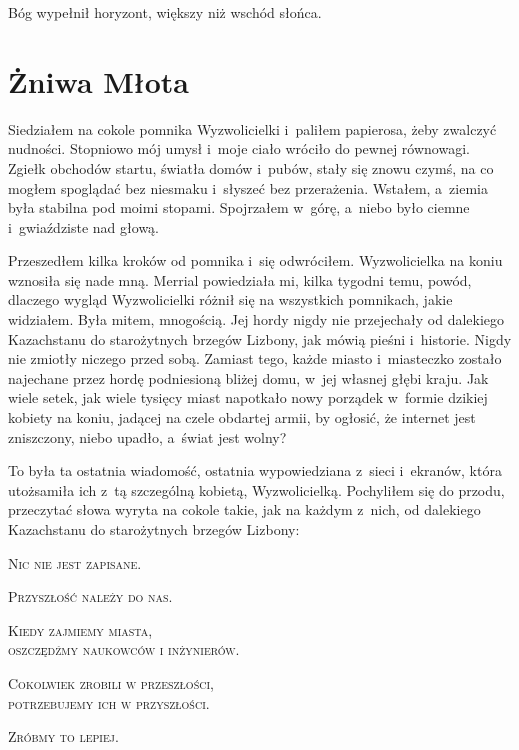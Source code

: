 \documentclass[oneside,polish,11pt,sfheadings]{mwbk}
\begin{document}
Bóg wypełnił horyzont, większy niż wschód słońca.


\chapter{Żniwa Młota}

Siedziałem na cokole pomnika Wyzwolicielki i~paliłem papierosa, żeby
zwalczyć nudności. Stopniowo mój umysł i~moje ciało wróciło do pewnej
równowagi. Zgiełk obchodów startu, światła domów i~pubów, stały się
znowu czymś, na co mogłem spoglądać bez niesmaku i~słyszeć bez
przerażenia. Wstałem, a~ziemia była stabilna pod moimi stopami.
Spojrzałem w~górę, a~niebo było ciemne i~gwiaździste nad głową.

Przeszedłem kilka kroków od pomnika i~się odwróciłem. Wyzwolicielka na
koniu wznosiła się nade mną. Merrial powiedziała mi, kilka tygodni temu,
powód, dlaczego wygląd Wyzwolicielki różnił się na wszystkich pomnikach,
jakie widziałem. Była mitem, mnogością. Jej hordy nigdy nie przejechały
od dalekiego Kazachstanu do starożytnych brzegów Lizbony, jak mówią
pieśni i~historie. Nigdy nie zmiotły niczego przed sobą. Zamiast tego,
każde miasto i~miasteczko zostało najechane przez hordę podniesioną
bliżej domu, w~jej własnej głębi kraju. Jak wiele setek, jak wiele
tysięcy miast napotkało nowy porządek w~formie dzikiej kobiety na koniu,
jadącej na czele obdartej armii, by ogłosić, że internet jest
zniszczony, niebo upadło, a~świat jest wolny?

To była ta ostatnia wiadomość, ostatnia wypowiedziana z~sieci i~ekranów,
która utożsamiła ich z~tą szczególną kobietą, Wyzwolicielką. Pochyliłem
się do przodu, przeczytać słowa wyryta na cokole takie, jak na każdym z~nich, od dalekiego Kazachstanu do starożytnych brzegów Lizbony:

\begin{center}

\textsc{Nic nie jest zapisane.} 

\textsc{Przyszłość należy do nas.}

\textsc{Kiedy zajmiemy miasta, \\ oszczędźmy naukowców i inżynierów. }

\textsc{Cokolwiek zrobili w przeszłości, \\ potrzebujemy ich w przyszłości.}

\textsc{Zróbmy to lepiej.\\}

\end{center}
\end{document}
